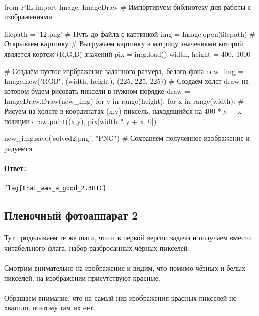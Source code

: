 \documentclass[12pt]{article}
\begin{document}
    \paragraph{}

    \begin{pythoncode}
from PIL import Image, ImageDraw  # Импортируем библиотеку для работы с изображениями

filepath = '12.png'         # Путь до файла с картинкой
img = Image.open(filepath)  # Открываем картинку
# Выгружаем картинку в матрицу значениями которой является кортеж (R,G,B) значений
pix = img.load()
width, height = 400, 1000

# Создаём пустое изрбражение заданного размера, белого фона
new_img = Image.new("RGB", (width, height), (225, 225, 225))
# Создаём холст draw на котором будем рисовать пиксели в нужном порядке
draw = ImageDraw.Draw(new_img)
for y in range(height):
    for x in range(width):
        # Рисуем на холсте в координатах (x,y) пиксель, находящийся на 400 * y + x позиции
        draw.point((x,y), pix[width * y + x, 0])

new_img.save('solved2.png', "PNG")  # Сохраняем полученное изображение и радуемся
    \end{pythoncode}
    \paragraph{Ответ:}
    \verb|flag{that_was_a_good_2.3BTC}|

    \subsection{Пленочный фотоаппарат 2}
    \paragraph{} %
    Тут проделываем те же шаги, что и в первой версии задачи и получаем вместо читабельного флага,
    набор разбросанных чёрных пикселей.
    \paragraph{}
    Смотрим внимательно на изображение и видим, что помимо чёрных и белых пикселей,
    на изображении присутствуют красные.
    \paragraph{}
    Обращаем внимание, что на самый низ изображения красных пикселей не хватило, поэтому там их нет.
\end{document}
